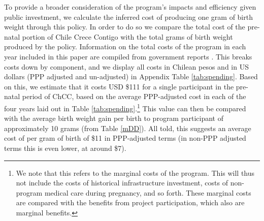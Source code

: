 \documentclass[12pt]{article}
\begin{document}
\begin{spacing}{1.4}
To provide a broader consideration of the program's impacts and
efficiency given public investment, we calculate the inferred
cost of producing one gram of birth weight through this policy.
In order to do so we compare the total cost of the pre-natal
portion of Chile Crece Contigo with the total grams of birth
weight produced by the policy.  Information on the total costs
of the program in each year included in this paper are compiled
from government reports \citep{Arrietetal2013}.  This breaks
costs down by component, and we display all costs in Chilean
pesos and in US dollars (PPP adjusted and un-adjusted) in Appendix
Table \ref{tab:spending}.  Based on this, we estimate that it
costs USD \$111 for a single participant in the pre-natal
period of ChCC, based on the average PPP-adjusted cost in each
of the four years laid out in Table \ref{tab:spending}.\footnote{
  We note that this refers to the marginal
  costs of the program.  This will thus not include the costs of
  historical infrastructure investment, costs of non-program
  medical care during pregnancy, and so forth.  These marginal costs
  are compared with the benefits from project participation, which
  also are marginal benefits.}
This value can then be compared with the average birth weight gain
per birth to program participant of approximately 10 grams (from
Table \ref{mDD}).  All told, this suggests an average cost of
per gram of birth of \$11 in PPP-adjusted terms (in non-PPP
adjusted terms this is even lower, at around \$7).


\end{spacing}
\end{document}
